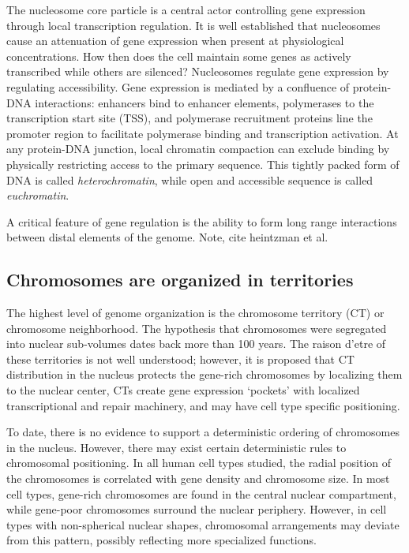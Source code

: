 The nucleosome core particle is a central actor controlling gene expression through local transcription regulation.  It is well established that nucleosomes
cause an attenuation of gene expression when present at physiological concentrations\cite{brown1984}\cite{lorch1987}\cite{laybourn1991}\cite{juan1994}. How
then does the cell maintain some genes as actively transcribed while others are silenced?  Nucleosomes regulate gene expression by regulating accessibility.
Gene expression is mediated by a confluence of protein-DNA interactions: enhancers bind to enhancer elements, polymerases to the transcription start site
(TSS), and polymerase recruitment proteins line the promoter region to facilitate polymerase binding and transcription activation\cite{cox2008}.  At
any protein-DNA junction, local chromatin compaction can exclude binding by physically restricting access to the primary sequence.  This tightly packed
form of DNA is called \textit{\gls{heterochromatin}}, while open and accessible sequence is called \textit{\gls{euchromatin}}.

A critical feature of gene regulation is the ability to form long range
interactions between distal elements of the genome.  Note, cite heintzman et al.

\subsection*{Chromosomes are organized in territories}

The highest level of genome organization is the chromosome territory (CT) or chromosome neighborhood\cite{cremer2001}.
The hypothesis that chromosomes were segregated into nuclear sub-volumes dates back more than 100
years\cite{cremer1993}.  The raison d'etre of these territories is not well understood; however, it is
proposed that CT distribution in the nucleus protects the gene-rich chromosomes by localizing them to
the nuclear center\cite{boyle2001}\cite{federico2006}, CTs create gene expression `pockets' with localized
transcriptional and repair machinery\cite{bolzer2005}, and may have cell type specific positioning.


To date, there is no evidence to support a deterministic ordering of chromosomes in the nucleus.  However,
there may exist certain deterministic rules to chromosomal positioning.  In all human cell types studied,
the radial position of the chromosomes is correlated with gene density and chromosome size\cite{sun2000}\cite{bolzer2005}.
In most cell types, gene-rich chromosomes are found in the central nuclear compartment, while gene-poor
chromosomes surround the nuclear periphery\cite{boyle2001}\cite{kozubek2005}.  However, in cell types with
non-spherical nuclear shapes, chromosomal arrangements may deviate from this pattern, possibly reflecting
more specialized functions\cite{bolzer2005}.


